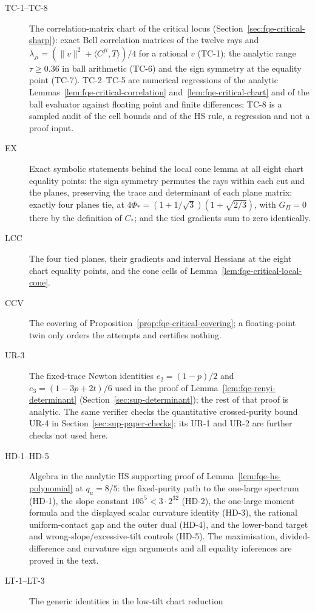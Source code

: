 \begin{description}
\item[TC-1--TC-8] The correlation-matrix chart of the critical locus
(Section~\ref{sec:fqe-critical-sharp}): exact Bell correlation matrices of the twelve rays and
$\lambda_{ji}=(\|v\|^2+\langle C^{ji},T\rangle)/4$ for a rational $v$ (TC-1); the analytic range
$\tau\ge0.36$ in ball arithmetic (TC-6) and the sign symmetry at the equality point (TC-7). TC-2--TC-5 are
numerical regressions of the analytic Lemmas~\ref{lem:fqe-critical-correlation}
and~\ref{lem:fqe-critical-chart} and of the ball evaluator against floating point and finite
differences; TC-8 is a sampled audit of the cell bounds and of the HS rule, a regression and not a
proof input.
\item[EX] Exact symbolic statements behind the local cone lemma at all eight chart equality points: the
sign symmetry permutes the rays within each cut and the planes, preserving the trace and determinant of
each plane matrix; exactly four planes tie, at $4\Phi_*=(1+1/\sqrt3)(1+\sqrt{2/3})$, with $G_\Pi=0$ there by the
definition of $C_*$; and the tied gradients sum to zero identically.
\item[LCC] The four tied planes, their gradients and interval Hessians at the eight chart equality points,
and the cone cells of Lemma~\ref{lem:fqe-critical-local-cone}.
\item[CCV] The covering of Proposition~\ref{prop:fqe-critical-covering}; a floating-point twin only orders
the attempts and certifies nothing.
\item[UR-3] The fixed-trace Newton identities $e_2=(1-p)/2$ and $e_3=(1-3p+2t)/6$ used in the proof of
Lemma~\ref{lem:fqe-renyi-determinant} (Section~\ref{sec:sup-determinant}); the rest of that proof is analytic.
The same verifier checks the quantitative crossed-purity bound UR-4 in
Section~\ref{sec:sup-paper-checks}; its UR-1 and UR-2 are further checks not used here.
\item[HD-1--HD-5] Algebra in the analytic HS supporting proof of
Lemma~\ref{lem:fqe-hs-polynomial} at $q_u=8/5$: the fixed-purity path to the one-large spectrum (HD-1),
the slope constant $105^5<3\cdot2^{32}$ (HD-2), the one-large moment formula and the displayed scalar
curvature identity (HD-3), the rational uniform-contact gap and the outer dual (HD-4), and the
lower-band target and wrong-slope/excessive-tilt controls (HD-5). The maximisation, divided-difference and curvature
sign arguments and all equality inferences are proved in the text.
\item[LT-1--LT-3] The generic identities in the low-tilt chart reduction

\end{description}
